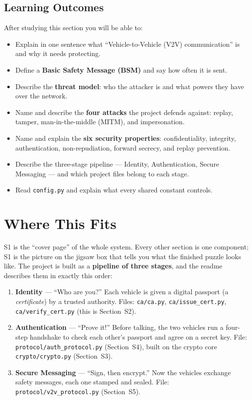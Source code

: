 \documentclass[11pt,a4paper]{report}
\begin{document}
\subsection*{Learning Outcomes}
After studying this section you will be able to:
\begin{itemize}
  \item Explain in one sentence what ``Vehicle-to-Vehicle (V2V) communication''
        is and why it needs protecting.
  \item Define a \textbf{Basic Safety Message (BSM)} and say how often it is sent.
  \item Describe the \textbf{threat model}: who the attacker is and what powers
        they have over the network.
  \item Name and describe the \textbf{four attacks} the project defends against:
        replay, tamper, man-in-the-middle (MITM), and impersonation.
  \item Name and explain the \textbf{six security properties}: confidentiality,
        integrity, authentication, non-repudiation, forward secrecy, and
        replay prevention.
  \item Describe the three-stage pipeline --- Identity, Authentication, Secure
        Messaging --- and which project files belong to each stage.
  \item Read \texttt{config.py} and explain what every shared constant controls.
\end{itemize}

\section{Where This Fits}

S1 is the ``cover page'' of the whole system. Every other section is one
component; S1 is the picture on the jigsaw box that tells you what the finished
puzzle looks like. The project is built as a \textbf{pipeline of three stages},
and the readme describes them in exactly this order:

\begin{enumerate}
  \item \textbf{Identity} --- ``Who are you?'' Each vehicle is given a digital
        passport (a \emph{certificate}) by a trusted authority. Files:
        \texttt{ca/ca.py}, \texttt{ca/issue\_cert.py}, \texttt{ca/verify\_cert.py}
        (this is Section~S2).
  \item \textbf{Authentication} --- ``Prove it!'' Before talking, the two
        vehicles run a four-step handshake to check each other's passport and
        agree on a secret key. File: \texttt{protocol/auth\_protocol.py}
        (Section~S4), built on the crypto core
        \texttt{crypto/crypto.py} (Section~S3).
  \item \textbf{Secure Messaging} --- ``Sign, then encrypt.'' Now the vehicles
        exchange safety messages, each one stamped and sealed. File:
        \texttt{protocol/v2v\_protocol.py} (Section~S5).
\end{enumerate}
\end{document}

